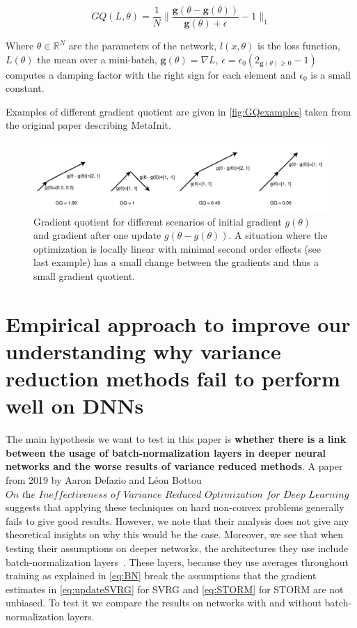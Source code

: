 \documentclass[a4paper,11pt,oneside]{report}
\begin{document}
\begin{equation}\label{eq:GQ}
    GQ(L,\theta) = \frac{1}{N}\biggl\lVert\frac{\textbf{g}(\theta-\textbf{g}(\theta))}{\textbf{g}(\theta)+\epsilon}-1 \biggr\rVert_1
\end{equation}

Where $\theta \in \mathbb{R}^N$ are the parameters of the network, $l(x, \theta)$ is the loss function, $L(\theta)$ the mean over a mini-batch, $\textbf{g}(\theta) = \nabla L$, $\epsilon = \epsilon_0(2_{\textbf{g}(\theta)\geq 0}-1)$ computes a damping factor with the right sign for each element and $\epsilon_0$ is a small constant.

Examples of different gradient quotient are given in \autoref{fig:GQexamples} taken from the original paper describing MetaInit.

\begin{figure}
    \centering
    \includegraphics{figures/MetaInit.png}
    \caption{Gradient quotient for different scenarios of initial gradient $g(\theta)$ and gradient after one update $g(\theta - g(\theta))$. A situation where the optimization is locally linear with minimal second order effects (see last example) has a small change between the gradients and thus a small gradient quotient.}
    \label{fig:GQexamples}
\end{figure}

\chapter{Empirical approach to improve our understanding  why variance reduction methods fail to  perform well on DNNs}

The main hypothesis we want to test in this paper is \textbf{whether there is a link between the usage of batch-normalization layers in deeper neural networks and the worse results of variance reduced methods}.
A paper from 2019 by Aaron Defazio and Léon Bottou $\textit{On the Ineffectiveness of Variance Reduced Optimization for Deep Learning}$ suggests that applying these techniques on hard non-convex problems generally fails to give good results. However, we note that their analysis does not give any theoretical insights on why this would be the case. Moreover, we see that when testing their assumptions on deeper networks, the architectures they use include batch-normalization layers~\cite{ioffe2015batch}. These layers, because they use averages throughout training as explained in \autoref{eq:BN} break the assumptions that the gradient estimates in \autoref{eq:updateSVRG} for SVRG and \autoref{eq:STORM} for STORM are not unbiased. To test it we compare the results on networks with and without batch-normalization layers.
\end{document}

